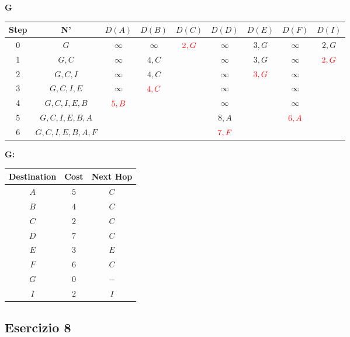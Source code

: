 \documentclass[10pt]{article}
\begin{document}
	\begin{center}
	\textbf{G}
 		\begin{tabular}{||c c c c c c c c c||} 
 			\hline
 			Step & N' & $D(A)$ & $D(B)$ & $D(C)$ & $D(D)$ & $D(E)$ & $D(F)$ & $D(I)$ \\
 			\hline\hline
 			0 & $G$ & $\infty$ & $\infty$ & $\color{red} 2,G$ & $\infty$ & $3,G$ & $\infty$ & $2,G$ \\
 			\hline
 			1 & $G,C$ & $\infty$ & $4,C$ & & $\infty$ & $3,G$ & $\infty$ & $\color{red} 2,G$ \\
 			\hline
			2 & $G,C,I$ & $\infty$ & $4,C$ & & $\infty$ & $\color{red} 3,G$ & $\infty$ & \\
			\hline
			3 & $G,C,I,E$ & $\infty$ & $\color{red} 4,C$ & & $\infty$ & & $\infty$ & \\ 
 			\hline
			4 & $G,C,I,E,B$ & $\color{red} 5,B$ & & & $\infty$ & & $\infty$ & \\
			\hline
			5 & $G,C,I,E,B,A$ & & & & $8,A$ & & $\color{red} 6,A$ & \\
			\hline
			6 & $G,C,I,E,B,A,F$ & & & & $\color{red} 7,F$ & & & \\[0.5ex]
 			\hline
		\end{tabular}
	\end{center}
	\begin{center}
	\textbf{G:}
		\begin{tabular}{||c || c || c||}
			\hline
 			Destination & Cost & Next Hop\\ [0.5ex] 
 			\hline\hline
			$A$ & $5$ & $C$\\
			$B$ & $4$ & $C$\\
 			$C$ & $2$ & $C$\\
			$D$ & $7$ & $C$\\
			$E$ & $3$ & $E$\\
			$F$ & $6$ & $C$\\
			$G$ & $0$ & $-$\\
			$I$ & $2$ & $I$\\[0.5ex] 
			\hline
		\end{tabular}
	\end{center}		
	
	\subsection{Esercizio 8}
	
\end{document}
